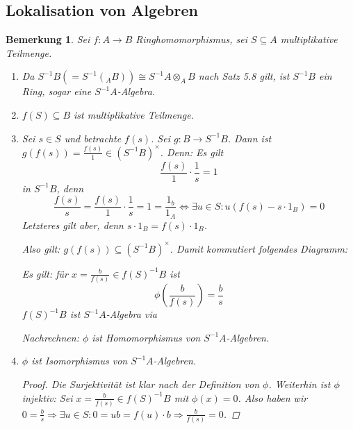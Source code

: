 \documentclass[12pt,a4paper]{scrartcl}
\theoremstyle{cplain}
\theoremstyle{cdef}
\newtheorem{beme}[thmcounter]{Bemerkung}
\begin{document}
\subsection{Lokalisation von Algebren}
\begin{beme}
	Sei $f\colon A\to B$ Ringhomomorphismus, sei $S\subseteq A$ multiplikative Teilmenge.
	\begin{enumerate}
		\item Da $S^{-1}B (= S^{-1}({}_AB))\cong S^{-1}A\otimes_A B$ nach Satz 5.8 gilt, ist $S^{-1}B$ ein Ring, sogar eine $S^{-1}A$-Algebra.
		\item $f(S)\subseteq B$ ist multiplikative Teilmenge.
		\item Sei $s\in S$ und betrachte $f(s)$. Sei $g\colon B\to S^{-1}B$. Dann ist $g(f(s)) = \frac{f(s)}{1} \in (S^{-1}B)^{\times}$. Denn: Es gilt 
		$$\frac{f(s)}{1} \cdot \frac{1}{s} = 1$$
		in $S^{-1}B$, denn 
		$$\frac{f(s)}{s} = \frac{f(s)}{1}\cdot \frac 1s = 1 = \frac{1_b}{1_A} \Longleftrightarrow \exists u\in S: u(f(s)-s\cdot 1_B) = 0$$
		Letzteres gilt aber, denn $s\cdot 1_B = f(s)\cdot 1_B$.
		
		Also gilt: $g(f(s)) \subseteq (S^{-1}B)^{\times}$. Damit kommutiert folgendes Diagramm:
		\begin{center}
		\end{center}
		Es gilt: für $x = \frac{b}{f(s)}\in f(S)^{-1}B$ ist 
		$$\phi(\frac{b}{f(s)}) = \frac{b}{s}$$
		$f(S)^{-1}B$ ist $S^{-1}A$-Algebra via
		\begin{center}
		\end{center}
		Nachrechnen: $\phi$ ist Homomorphismus von $S^{-1}A$-Algebren.
		\item $\phi$ ist Isomorphismus von $S^{-1}A$-Algebren.
		\begin{proof}
			Die Surjektivität ist klar nach der Definition von $\phi$. Weiterhin ist $\phi$ injektiv: Sei $x = \frac{b}{f(s)}\in f(S)^{-1}B$ mit $\phi(x) = 0$. Also haben wir $0 = \frac bs \Rightarrow \exists u\in S: 0  = ub = f(u)\cdot b \Rightarrow \frac{b}{f(s)} = 0$.
		\end{proof}
	\end{enumerate}	
\end{beme}
\end{document}
